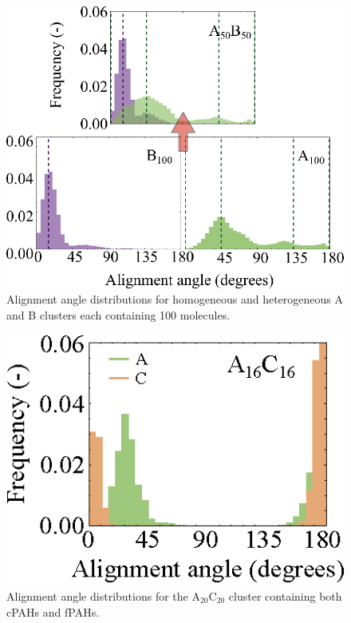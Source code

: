 \begin{figure}[!tbh]
\centering
\includegraphics[width=0.8\linewidth]{Figures/alignment_angles_heteroSI.eps}
\caption{Alignment angle distributions for homogeneous and heterogeneous A and B clusters each containing 100 molecules.}
\label{figSI:alignmentangles_100}
\end{figure}

\begin{figure}[!tbh]
\centering
\includegraphics[width=0.5\linewidth]{Figures/alignment_angles_ann20cor20.eps}
\caption{Alignment angle distributions for the $\text{A}_{\text{20}}\text{C}_{\text{20}}$ cluster containing both cPAHs and fPAHs.}
\label{figSI:alignmentangles_ann20cor20}
\end{figure}
%

